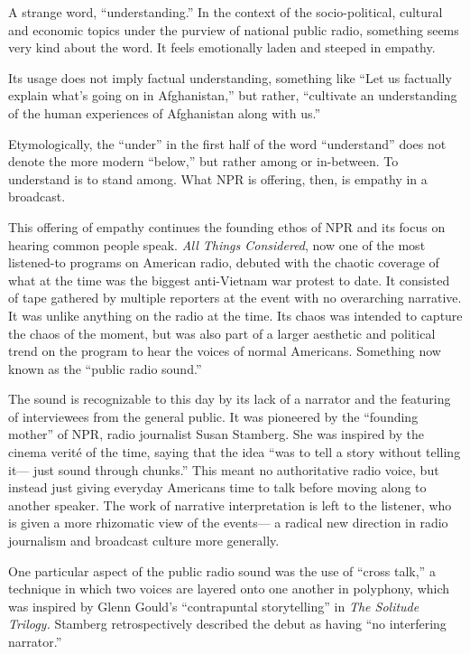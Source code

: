 \documentclass[12pt,letterpaper]{article}
\begin{document}
	A strange word, ``understanding.'' In the context of the 
	socio-political,
	cultural and economic topics under the purview of national public 
	radio, something seems very kind about the word. It feels emotionally
	laden and steeped in empathy. 

	Its usage does not imply factual understanding, something like ``Let
	us factually explain what's going on in Afghanistan,'' but rather, 
	``cultivate an understanding of the human experiences of Afghanistan 
	along with us.'' 


	Etymologically, the ``under'' in the first half of the word 
	``understand'' does not denote the more modern ``below,'' but rather 
	among or in-between. \autocite{Ety} To understand is to stand among. 
	What NPR is offering, then, is empathy in a broadcast. 


	This offering of empathy continues the founding ethos of NPR 
	and its focus on hearing common people speak. 
	\textit{All Things Considered}, now one of the most listened-to programs
	on American radio, debuted with the chaotic coverage of
	what at the time was the biggest anti-Vietnam war protest to date. It
	consisted of tape gathered by multiple reporters at the event with no 
	overarching narrative. It was unlike anything on the radio at the time.
	Its chaos was intended to capture the chaos of the moment, but was also
	part of a larger aesthetic and political trend on the program to hear 
	the voices of normal Americans. Something now known as the 
	``public radio sound.'' 

	The sound is recognizable to this day by its lack of a 
	narrator and the featuring of interviewees from the general public. It 
	was pioneered by the ``founding mother'' of NPR, radio 
	journalist Susan Stamberg. She was inspired by the cinema verité of the
	time, saying that the idea ``was to tell a story without telling it---
	just sound through chunks.'' This meant no authoritative radio voice,
	but instead just giving everyday Americans time to talk before moving 
	along to another speaker. The work of narrative interpretation is left
	to the listener, who is given a more rhizomatic view of the events---
	a radical new direction in radio journalism and broadcast culture more
	generally.  

	One particular aspect of the public radio sound was the use of ``cross
	talk,'' a technique in which two voices are layered onto one another 	
	in polyphony, which was inspired by Glenn Gould's ``contrapuntal 
	storytelling'' in \textit{The Solitude Trilogy.}\autocite[197]{Porter}
	Stamberg retrospectively described the debut as having ``no interfering 
	narrator.''\autocite[185]{Porter}
\end{document}
